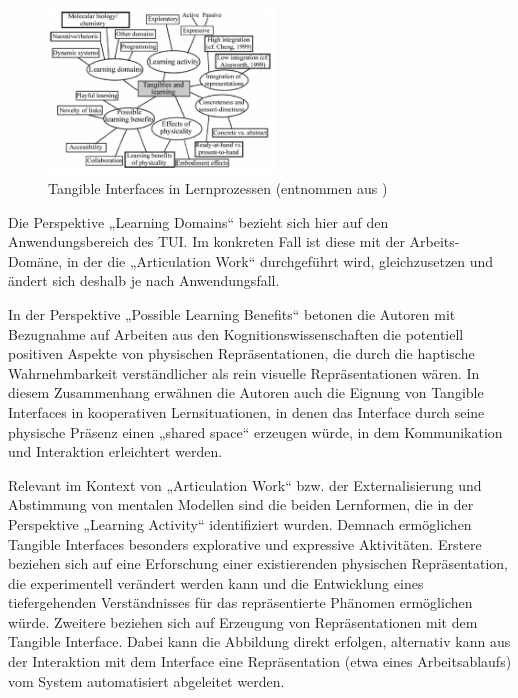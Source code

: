 \begin{figure}[htbp]
	\centering
		\includegraphics[width=6cm]{img/ImplementierungUeberblick/marshall_tui_learning.png}
	\caption[Tangible Interfaces in Lernprozessen]{Tangible Interfaces in Lernprozessen (entnommen aus \citet{Marshall07})}
	\label{fig:img_ImplementierungUeberblick_marshall_tui_learning}
\end{figure}

Die Perspektive „Learning Domains“ bezieht sich hier auf den Anwendungsbereich des \gls{TUI}. Im konkreten Fall ist diese mit der Arbeits-Domäne, in der die „Articulation Work“ durchgeführt wird, gleichzusetzen und ändert sich deshalb je nach Anwendungsfall.

In der Perspektive „Possible Learning Benefits“ betonen die Autoren mit Bezugnahme auf Arbeiten aus den Kognitionswissenschaften die potentiell positiven Aspekte von physischen Repräsentationen, die durch die haptische Wahrnehmbarkeit verständlicher als rein visuelle Repräsentationen wären. In diesem Zusammenhang erwähnen die Autoren auch die Eignung von Tangible Interfaces in kooperativen Lernsituationen, in denen das Interface durch seine physische Präsenz einen „shared space“ erzeugen würde, in dem Kommunikation und Interaktion erleichtert werden.

Relevant im Kontext von „Articulation Work“ bzw. der Externalisierung und Abstimmung von mentalen Modellen sind die beiden Lernformen, die in der Perspektive „Learning Activity“ identifiziert wurden. Demnach ermöglichen Tangible Interfaces besonders explorative und expressive Aktivitäten. Erstere beziehen sich auf eine Erforschung einer existierenden physischen Repräsentation, die experimentell verändert werden kann und die Entwicklung eines tiefergehenden Verständnisses für das repräsentierte Phänomen ermöglichen würde. Zweitere beziehen sich auf Erzeugung von Repräsentationen mit dem Tangible Interface. Dabei kann die Abbildung direkt erfolgen, alternativ kann aus der Interaktion mit dem Interface eine Repräsentation (etwa eines Arbeitsablaufs) vom System automatisiert abgeleitet werden.

